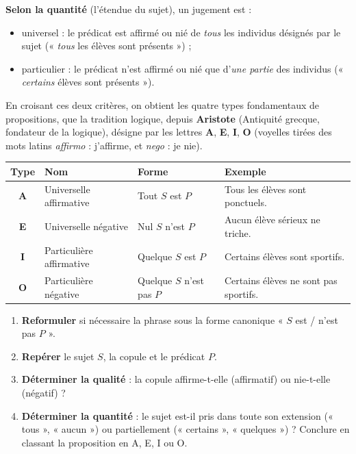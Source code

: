 \documentclass[11pt]{article}
\newcommand{\cle}[1]{{\popxbold\color{popdark}#1}}
\begin{document}
\textbf{Selon la quantité} (l'étendue du sujet), un jugement est :
\begin{itemize}
\item \cle{universel} : le prédicat est affirmé ou nié de \emph{tous} les individus désignés par le sujet (« \emph{tous} les élèves sont présents ») ;
\item \cle{particulier} : le prédicat n'est affirmé ou nié que d'\emph{une partie} des individus (« \emph{certains} élèves sont présents »).
\end{itemize}

En croisant ces deux critères, on obtient les quatre types fondamentaux de propositions, que la tradition logique, depuis \textbf{Aristote} (Antiquité grecque, fondateur de la logique), désigne par les lettres \textbf{A}, \textbf{E}, \textbf{I}, \textbf{O} (voyelles tirées des mots latins \emph{affirmo} : j'affirme, et \emph{nego} : je nie).

\begin{aretenir}
\begin{center}
\begin{tabularx}{\linewidth}{|c|l|X|l|}
\hline
\rowcolor{popblueL} \textbf{Type} & \textbf{Nom} & \textbf{Forme} & \textbf{Exemple} \\
\hline
\textbf{A} & Universelle affirmative & Tout $S$ est $P$ & Tous les élèves sont ponctuels. \\
\hline
\textbf{E} & Universelle négative & Nul $S$ n'est $P$ & Aucun élève sérieux ne triche. \\
\hline
\textbf{I} & Particulière affirmative & Quelque $S$ est $P$ & Certains élèves sont sportifs. \\
\hline
\textbf{O} & Particulière négative & Quelque $S$ n'est pas $P$ & Certains élèves ne sont pas sportifs. \\
\hline
\end{tabularx}
\end{center}
\end{aretenir}

\begin{methode}
\begin{enumerate}
\item \textbf{Reformuler} si nécessaire la phrase sous la forme canonique « $S$ est / n'est pas $P$ ».
\item \textbf{Repérer} le sujet $S$, la copule et le prédicat $P$.
\item \textbf{Déterminer la qualité} : la copule affirme-t-elle (affirmatif) ou nie-t-elle (négatif) ?
\item \textbf{Déterminer la quantité} : le sujet est-il pris dans toute son extension (« tous », « aucun ») ou partiellement (« certains », « quelques ») ? Conclure en classant la proposition en A, E, I ou O.
\end{enumerate}
\end{methode}
\end{document}
